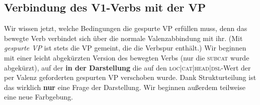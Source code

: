 \documentclass[10pt,a3paper]{article}
\newcommand{\rot}[1]{\textcolor{rot}{#1}}
\newcommand{\blau}[1]{\textcolor{blau}{#1}}
\newcommand{\gruen}[1]{\textcolor{gruen}{#1}}
\newcommand{\orongsch}[1]{\textcolor{orongsch}{#1}}
\newcommand{\tuerkis}[1]{\textcolor{tuerkis}{#1}}
\newcommand*{\mybox}[1]{\framebox{#1}}
\newcommand{\Zeile}{\vspace{\baselineskip}}
\begin{document}
\Zeile


\subsection{Verbindung des V1-Verbs mit der VP}\label{sec:top}

Wir wissen jetzt, welche Bedingungen die gespurte VP erfüllen muss, denn das bewegte Verb verbindet sich über die normale Valenzabbindung mit ihr.
(Mit \textit{gespurte VP} ist stets die VP gemeint, die die Verbspur enthält.)
Wir beginnen mit einer leicht abgekürzten Version des bewegten Verbs (nur die \textsc{subcat} wurde abgekürzt), auf der \textbf{in der Darstellung} die \blau{\mybox{1}} auf den \blau{\textsc{loc|cat|head|dsl}-Wert der per Valenz geforderten gespurten VP} verschoben wurde.
Dank Strukturteilung ist das wirklich \textbf{nur} eine Frage der Darstellung.
Wir beginnen außerdem teilweise eine neue Farbgebung.
\end{document}
